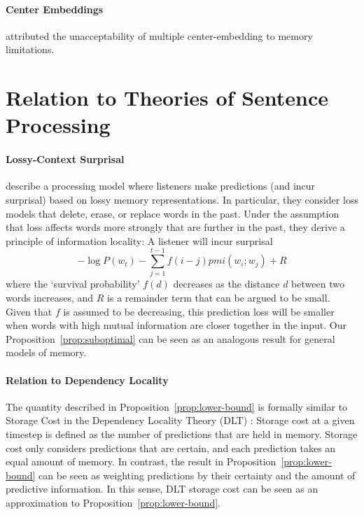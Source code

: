 \documentclass[11pt,letterpaper]{article}
\begin{document}
\paragraph{Center Embeddings}

\cite{miller-finitary-1963} attributed the unacceptability of multiple center-embedding to memory limitations.








\section{Relation to Theories of Sentence Processing}


\paragraph{Lossy-Context Surprisal}
\citet{futrell-noisy-context-2017} describe a processing model where listeners make predictions (and incur surprisal) based on lossy memory representations.
In particular, they consider loss models that delete, erase, or replace words in the past.
Under the assumption that loss affects words more strongly that are further in the past, they derive a principle of information locality:
A listener will incur surprisal
$$ -\log P(w_t) - \sum_{j=1}^{t-1} f(i-j) pmi(w_i; w_j) + R$$
where the `survival probability' $f(d)$ decreases as the distance $d$ between two words increases, and $R$ is a remainder term that can be argued to be small.
Given that $f$ is assumed to be decreasing, this prediction loss will be smaller when words with high mutual information are closer together in the input.
Our Proposition~\ref{prop:suboptimal} can be seen as an analogous result for general models of memory.






\paragraph{Relation to Dependency Locality}
The quantity described in Proposition~\ref{prop:lower-bound} is formally similar to Storage Cost in the Dependency Locality Theory (DLT) \citep{gibson-linguistic-1998}: Storage cost at a given timestep is defined as the number of predictions that are held in memory.
Storage cost only considers predictions that are certain, and each prediction takes an equal amount of memory.
In contrast, the result in Proposition~\ref{prop:lower-bound} can be seen as weighting predictions by their certainty and the amount of predictive information.
In this sense, DLT storage cost can be seen as an approximation to Proposition~\ref{prop:lower-bound}.
\end{document}
